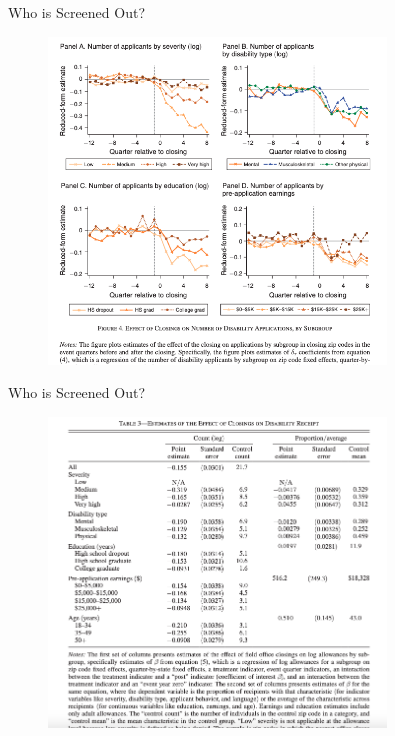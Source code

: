 \documentclass{beamer}
\begin{document}
\begin{frame}{Who is Screened Out?}
    \begin{figure}
        \centering
        \includegraphics[width=0.8\textwidth]{F4.png}
    \end{figure}
\end{frame}


\begin{frame}{Who is Screened Out?}
    \begin{figure}
        \centering
        \includegraphics[width=0.8\textwidth]{T3.png}
    \end{figure}
\end{frame}
\end{document}

